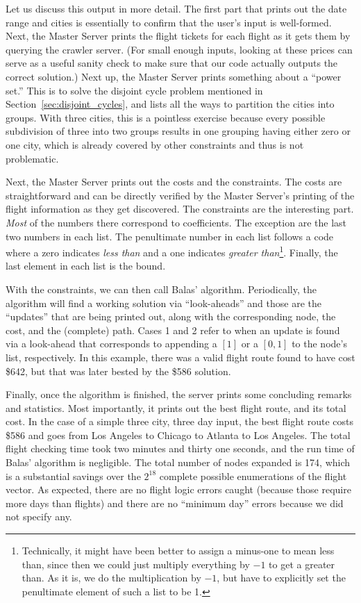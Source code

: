 \documentclass{article}
\begin{document}
Let us discuss this output in more detail. The first part that prints out the date range and cities is essentially to confirm that the user's input is
well-formed. Next, the Master Server prints the flight tickets for each flight as it gets them by querying the crawler server. (For small enough
inputs, looking at these prices can serve as a useful sanity check to make sure that our code actually outputs the correct solution.) Next up, the
Master Server prints something about a ``power set.'' This is to solve the disjoint cycle problem mentioned in Section~\ref{sec:disjoint_cycles}, and
lists all the ways to partition the cities into groups. With three cities, this is a pointless exercise because every possible subdivision of three
into two groups results in one grouping having either zero or one city, which is already covered by other constraints and thus is not problematic.

Next, the Master Server prints out the costs and the constraints. The costs are straightforward and can be directly verified by the Master Server's
printing of the flight information as they get discovered. The constraints are the interesting part. \emph{Most} of the numbers there correspond to
coefficients. The exception are the last two numbers in each list. The penultimate number in each list follows a code where a zero indicates
\emph{less than} and a one indicates \emph{greater than}\footnote{Technically, it might have been better to assign a minus-one to mean less than,
since then we could just multiply everything by $-1$ to get a greater than. As it is, we do the multiplication by $-1$, but have to explicitly set the
penultimate element of such a list to be 1.}. Finally, the last element in each list is the bound.

With the constraints, we can then call Balas' algorithm. Periodically, the algorithm will find a working solution via ``look-aheads'' and those are
the ``updates'' that are being printed out, along with the corresponding node, the cost, and the (complete) path. Cases 1 and 2 refer to when an
update is found via a look-ahead that corresponds to appending a $[1]$ or a $[0,1]$ to the node's list, respectively. In this example, there was a
valid flight route found to have cost \$642, but that was later bested by the \$586 solution.

Finally, once the algorithm is finished, the server prints some concluding remarks and statistics. Most importantly, it prints out the best flight
route, and its total cost. In the case of a simple three city, three day input, the best flight route costs \$586 and goes from Los Angeles to Chicago
to Atlanta to Los Angeles. The total flight checking time took two minutes and thirty one seconds, and the run time of Balas' algorithm is negligible.
The total number of nodes expanded is 174, which is a substantial savings over the $2^{18}$ complete possible enumerations of the flight vector. As
expected, there are no flight logic errors caught (because those require more days than flights) and there are no ``minimum day'' errors because we
did not specify any.
\end{document}
